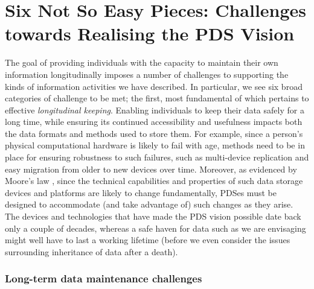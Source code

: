 \documentclass{acm_proc_article-sp}
\begin{document}

\section{Six Not So Easy Pieces: Challenges towards Realising the PDS Vision}


The goal of providing individuals with the capacity to maintain their own information longitudinally imposes a number of challenges to supporting the kinds of information activities we have described. In particular, we see six broad categories of challenge to be met; the first, most fundamental of which pertains to effective \emph{longitudinal keeping}. Enabling individuals to keep their data safely for a long time, while ensuring its continued accessibility and usefulness impacts both the data formats and methods used to store them. For example, since a person's physical computational hardware is likely to fail with age, methods need to be in place for ensuring robustness to such failures, such as multi-device replication and easy migration from older to new devices over time.  Moreover, as evidenced by Moore's law \cite{schaller1997moore}, since the technical capabilities and properties of such data storage devices and platforms are likely to change fundamentally, PDSes must be designed to accommodate (and take advantage of) such changes as they arise. The devices and technologies that have made the PDS vision possible date back only a couple of decades, whereas a safe haven for data such as we are envisaging might well have to last a working lifetime (before we even consider the issues surrounding inheritance of data after a death).

\subsubsection{Long-term data maintenance challenges}
\end{document}
